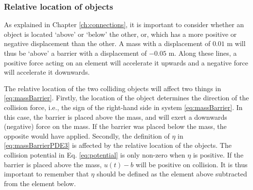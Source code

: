 \subsubsection{Relative location of objects}
As explained in Chapter \ref{ch:connections}, it is important to consider whether an object is located `above' or `below' the other, 
%
or, which has a more positive or negative displacement than the other. A mass with a displacement of $0.01$ m will thus be `above' a barrier with a displacement of $-0.05$ m. Along these lines, a positive force acting on an element will accelerate it upwards and a negative force will accelerate it downwards.

The relative location of the two colliding objects will affect two things in \eqref{eq:massBarrier}.
Firstly, the location of the object determines the direction of the collision force, i.e., the sign of the right-hand side in system \eqref{eq:massBarrier}. In this case, the barrier is placed above the mass, and will exert a downwards (negative) force on the mass. If the barrier was placed below the mass, the opposite would have applied.
Secondly, the definition of $\eta$ in \eqref{eq:massBarrierPDE3} is affected by the relative location of the objects. The collision potential in Eq. \eqref{eq:potential} is only non-zero when $\eta$ is positive. If the barrier is placed above the mass, $u(t)-b$ will be positive on collision. It is thus important to remember that $\eta$ should be defined as the element above subtracted from the element below.

